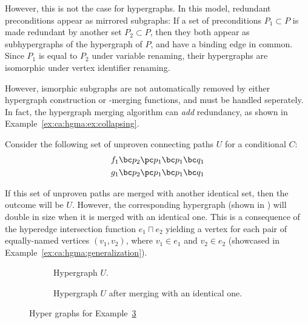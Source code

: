\documentclass[../Master.tex]{subfiles}
\providecommand{\master}{..}
\begin{document}
However, this is not the case for hypergraphs. In this model, redundant preconditions appear as mirrored subgraphs: If a set of preconditions $P_1 \subset P$ is made redundant by another set $P_2 \subset P$, then they both appear as subhypergraphs of the hypergraph of $P$, and have a binding edge in common. Since $P_1$ is equal to $P_2$ under variable renaming, their hypergraphs are isomorphic under vertex identifier renaming. 

However, ismorphic subgraphs are not automatically removed by either hypergraph construction or -merging functions, and must be handled seperately. In fact, the hypergraph merging algorithm can \textit{add} redundancy, as shown in Example~\ref{ex:ca:hgma:ex:collapsing}.

\begin{example}\label{ex:ca:hgma:ex:collapsing}
    
    Consider the following set of unproven connecting paths $U$ for a conditional $C$:
    \begin{align*}
        f_1 \bc p_2 \pc p_1 \bc p_1 \bc q_1 \\
        g_1 \bc p_2 \pc p_1 \bc p_1 \bc q_1
    \end{align*}

    If this set of unproven paths are merged with another identical set, then the outcome will be $U$. However, the corresponding hypergraph (shown in ) will double in size when it is merged with an identical one. This is a consequence of the hyperedge intersection function $e_1 \sqcap e_2$ yielding a vertex for each pair of equally-named vertices $\left(v_1, v_2\right)$, where $v_1 \in e_1$ and $v_2 \in e_2$ (showcased in Example~\ref{ex:ca:hgma:generalization}).

	\begin{figure}
        \centering
        \hfill
        \begin{subfigure}[b]{0.4\textwidth}
            \centering
            \resizebox{0.7\linewidth}{!}{}
            \caption{Hypergraph $U$.}
            \label{fig:ex:ca:hgma:ex:isomorphic}
        \end{subfigure}%
        \hfill%
        \begin{subfigure}[b]{0.4\textwidth}
            \centering
            \resizebox{0.75\linewidth}{!}{}
            \caption{Hypergraph $U$ after merging with an identical one.}
            \label{fig:ex:ca:hgma:ex:isomorphicReduced}
        \end{subfigure}
		\caption{Hyper graphs for Example~\ref{fig:ex:ca:hgma:ex:collapsing}}\label{fig:ex:ca:hgma:ex:collapsing}
        \hfill
    \end{figure}
\end{example}
\end{document}
